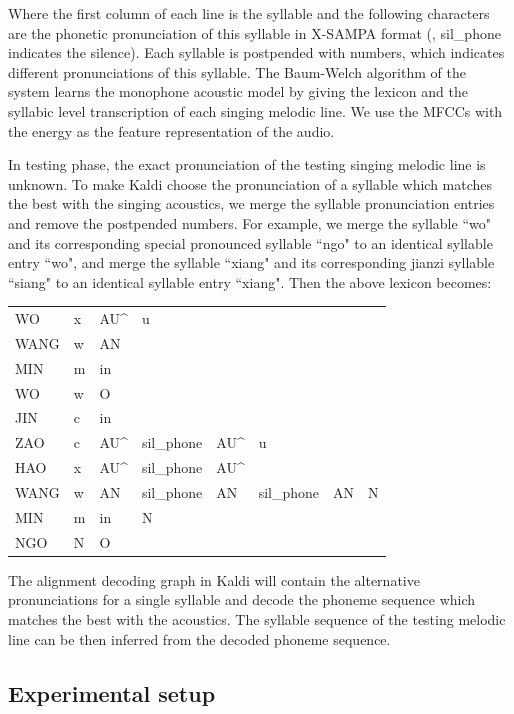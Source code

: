 Where the first column of each line is the syllable and the following characters are the phonetic pronunciation of this syllable in X-SAMPA format (, sil\_phone indicates the silence). Each syllable is postpended with numbers, which indicates different pronunciations of this syllable. The Baum-Welch algorithm of the system learns the monophone acoustic model by giving the lexicon and the syllabic level transcription of each singing melodic line. We use the MFCCs with the energy as the feature representation of the audio.

In testing phase, the exact pronunciation of the testing singing melodic line is unknown. To make Kaldi choose the pronunciation of a syllable which matches the best with the singing acoustics, we merge the syllable pronunciation entries and remove the postpended numbers. For example, we merge the syllable ``wo" and its corresponding special pronounced syllable ``ngo" to an identical syllable entry ``wo", and merge the syllable ``xiang" and its corresponding \gls{jianzi} syllable ``siang" to an identical syllable entry ``xiang". Then the above lexicon becomes:

\begin{table}[ht!]
\begin{tabular}{llllllll}
WO & x & AU\^ & u & & & & \\
WANG & w & AN & & & & & \\
MIN & m & in & & & & & \\
WO & w & O & & & & & \\
JIN & c & in & & & & & \\
ZAO & c & AU\^ & sil\_phone & AU\^ & u & & \\
HAO & x & AU\^ & sil\_phone & AU\^ & & & \\
WANG & w & AN & sil\_phone & AN & sil\_phone & AN & N \\
MIN & m & in & N & & & & \\
NGO & N & O & & & & &
\end{tabular}
\end{table}

The alignment decoding graph in Kaldi will contain the alternative pronunciations for a single syllable and decode the phoneme sequence which matches the best with the acoustics. The syllable sequence of the testing melodic line can be then inferred from the decoded phoneme sequence.

\subsection{Experimental setup}\label{sec:ch6:experimental_setup_baseline}

